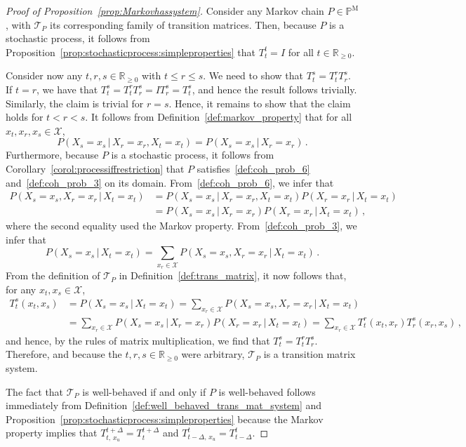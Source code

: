 \documentclass[10pt,a4paper]{paper}
\theoremstyle{definition}
\newcommand{\reals}{\mathbb{R}}
\newcommand{\realsnonneg}{\reals_{\geq 0}}
\newcommand{\states}{\mathcal{X}}
\newcommand{\processes}{\mathbb{P}}
\newcommand{\mprocesses}{\processes^{\mathrm{M}}}
\begin{document}
\begin{proof}[Proof of Proposition~\ref{prop:Markovhassystem}]
Consider any Markov chain $P\in\mprocesses$, with $\mathcal{T}_P$ its corresponding family of transition matrices. Then, because $P$ is a stochastic process, it follows from Proposition~\ref{prop:stochasticprocess:simpleproperties} that $T_t^t=I$ for all $t\in\realsnonneg$. 

Consider now any $t,r,s\in\realsnonneg$ with $t\leq r\leq s$. We need to show that $T_t^s=T_t^rT_r^s$. If $t=r$, we have that $T_t^s=T_t^rT_r^s=IT_r^s=T_t^s$, and hence the result follows trivially. Similarly, the claim is trivial for $r=s$. Hence, it remains to show that the claim holds for $t < r < s$. It follows from Definition~\ref{def:markov_property} that for all $x_t,x_r,x_s\in\states$,
\begin{equation*}
P(X_s=x_s\,\vert\,X_r=x_r,X_t=x_t) = P(X_s=x_s\,\vert\,X_r=x_r)\,.
\end{equation*}
Furthermore, because $P$ is a stochastic process, it follows from Corollary~\ref{corol:processiffrestriction} that $P$ satisfies~\ref{def:coh_prob_6} and~\ref{def:coh_prob_3} on its domain. From~\ref{def:coh_prob_6}, we infer that
\begin{align*}
P(X_s=x_s,X_r=x_r\,\vert\,X_t=x_t) &= P(X_s=x_s\,\vert\,X_r=x_r,X_t=x_t)P(X_r=x_r\,\vert\,X_t=x_t) \\
 &= P(X_s=x_s\,\vert\,X_r=x_r)P(X_r=x_r\,\vert\,X_t=x_t)\,,
\end{align*}
where the second equality used the Markov property. From~\ref{def:coh_prob_3}, we infer that
\begin{equation*}
P(X_s=x_s\,\vert\,X_t=x_t) = \sum_{x_r\in\states} P(X_s=x_s,X_r=x_r\,\vert\,X_t=x_t)\,.
\end{equation*}
From the definition of $\mathcal{T}_P$ in Definition~\ref{def:trans_matrix}, it now follows that, for any $x_t,x_s\in\states$,
\begin{align*}
T_t^s(x_t,x_s) &= P(X_s=x_s\,\vert\,X_t=x_t) = \sum_{x_r\in\states} P(X_s=x_s,X_r=x_r\,\vert\,X_t=x_t) \\
 &= \sum_{x_r\in\states} P(X_s=x_s\,\vert\,X_r=x_r)P(X_r=x_r\,\vert\,X_t=x_t) = \sum_{x_r\in\states} T_t^r(x_t,x_r) T_r^s(x_r,x_s)\,,
\end{align*}
and hence, by the rules of matrix multiplication, we find that $T_t^s=T_t^rT_r^s$. Therefore, and because the $t,r,s\in\realsnonneg$ were arbitrary, $\mathcal{T}_P$ is a transition matrix system.

The fact that $\mathcal{T}_P$ is well-behaved if and only if $P$ is well-behaved follows immediately from Definition~\ref{def:well_behaved_trans_mat_system} and Proposition~\ref{prop:stochasticprocess:simpleproperties} because the Markov property implies that $T_{t,\,x_u}^{t+\Delta}=T_{t}^{t+\Delta}$ and $T_{t-\Delta,\,x_u}^{t}=T_{t-\Delta}^{t}$.
\end{proof}
\end{document}
